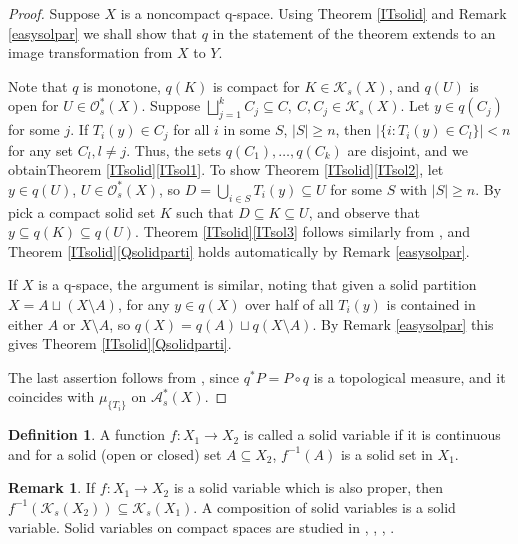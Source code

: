 \documentclass[sn-mathphys-num]{sn-jnl}%
\theoremstyle{thmstyleone}%
\theoremstyle{definition}
\newtheorem{definition}[theorem]{Definition}
\newtheorem{remark}[theorem]{Remark}
\begin{document}
\begin{proof} 
Suppose $X$ is a noncompact  q-space.
Using Theorem \ref{ITsolid} and Remark \ref{easysolpar}
we shall show that $q$ in the statement of the theorem extends to an image transformation from $X$ to $Y$. 

Note that $q$ is monotone,  $q(K)$ is compact for $K \in \mathscr{K}_{s}(X)$, and  $q(U)$ is open for $U \in  \mathscr{O}_{s}^*(X)$. 
Suppose  $\bigsqcup_{j=1}^k C_j \subseteq C,  \  C, C_j \in \mathscr{K}_{s}(X)$. Let $y \in q(C_j)$ for some $j$.
If  $  T_i(y) \in C_j$ for all $i$ in some $S$, $ |S| \ge n$, then $| \{ i:  T_i (y) \in C_l \}| < n$ for any set $C_l, l \neq j$. 
Thus, the sets $q(C_1), \ldots, q(C_k)$  are disjoint, 
and we obtainTheorem \ref{ITsolid}\ref{ITsol1}.  
To show Theorem \ref{ITsolid}\ref{ITsol2}, let $ y \in q(U)$, $U \in \mathscr{O}_{s}^{*}(X)$, so
$ D = \bigcup_{i \in S} T_i(y) \subseteq U$ for some $S$ with  $|S|  \ge n$. 
By \cite[Th. 3.10 (1)]{Butler:TMLCconstr} pick a compact solid set $K$ such that $ D \subseteq K \subseteq U$, 
and observe that $y \subseteq q(K) \subseteq q(U)$.
Theorem \ref{ITsolid}\ref{ITsol3} follows similarly from \cite[Th. 3.10 (2)]{Butler:TMLCconstr}, and
Theorem \ref{ITsolid}\ref{Qsolidparti} holds automatically by Remark \ref{easysolpar}. 

If $X$ is a q-space, the argument is similar, noting that given a solid partition $X = A \sqcup (X \setminus A)$, 
for any $y \in q(X)$ over half of all $ T_i(y)$ is contained in either $A$ or $X \setminus A$, so $q(X) = q(A) \sqcup q(X \setminus A)$. 
By Remark \ref{easysolpar}
this gives Theorem \ref{ITsolid}\ref{Qsolidparti}. 

The last assertion follows from  \cite[Th. 10.7]{Butler:TMLCconstr}, 
since  $q^* P = P \circ q$  is a topological measure, and it coincides with  $ \mu_{\{T_i\}}$ on $\mathscr{A}_{s}^{*}(X)$. 
\end{proof}

\begin{definition} 
A function $f :X_1 \longrightarrow X_2$ is called a solid variable if it is continuous and for a solid (open or closed) set $A \subseteq X_2$,  
$f^{-1} (A)$ is a solid set in $X_1$.
\end{definition}

\begin{remark}
If $f :X_1 \longrightarrow X_2$ is a solid variable which is also proper, then $f^{-1} (\mathscr{K}_{s}(X_2))  \subseteq \mathscr{K}_{s}(X_1)$.
A composition of solid variables is a solid variable. 
Solid variables on compact spaces are studied in \cite{AarnesJohansenRustad}, \cite{OrjanAlf:HomSimpleTM},   \cite{AlfImTrans}, \cite{AlfMedian}.
\end{remark} 
\end{document}

